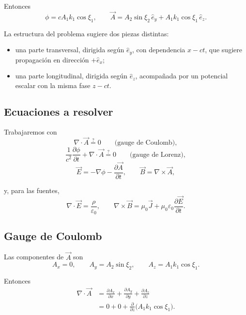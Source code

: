 \documentclass{article}
\numberwithin{equation}{section}
\begin{document}
Entonces
\begin{equation}
\phi=cA_1k_1\cos\xi_1,
\qquad
\vec A=A_2\sin\xi_2\,\hat e_y + A_1k_1\cos\xi_1\,\hat e_z.
\end{equation}

La estructura del problema sugiere dos piezas distintas:
\begin{itemize}
    \item una parte transversal, dirigida según $\hat e_y$, con dependencia $x-ct$, que sugiere propagación en dirección $+\hat e_x$;
    \item una parte longitudinal, dirigida según $\hat e_z$, acompañada por un potencial escalar con la misma fase $z-ct$.
\end{itemize}


\subsection{Ecuaciones a resolver}
Trabajaremos con
\begin{equation}
\nabla\cdot\vec A \stackrel{?}{=} 0 \qquad \text{(gauge de Coulomb)},
\end{equation}
\begin{equation}
\frac{1}{c^2}\frac{\partial \phi}{\partial t}+\nabla\cdot\vec A \stackrel{?}{=} 0 \qquad \text{(gauge de Lorenz)},
\end{equation}
\begin{equation}
\vec E=-\nabla\phi-\frac{\partial\vec A}{\partial t},
\qquad
\vec B=\nabla\times\vec A,
\end{equation}

y, para las fuentes,
\begin{equation}
\nabla\cdot\vec E=\frac{\rho}{\varepsilon_0},
\qquad
\nabla\times\vec B=\mu_0\vec J+\mu_0\varepsilon_0\frac{\partial\vec E}{\partial t}.
\end{equation}

\subsection{Gauge de Coulomb}
Las componentes de $\vec A$ son
\begin{equation}
A_x=0,
\qquad
A_y=A_2\sin\xi_2,
\qquad
A_z=A_1k_1\cos\xi_1.
\end{equation}

Entonces
\begin{align}
\nabla\cdot\vec A
&=\frac{\partial A_x}{\partial x}+\frac{\partial A_y}{\partial y}+\frac{\partial A_z}{\partial z} \\
&=0+0+\frac{\partial}{\partial z}\big(A_1k_1\cos\xi_1\big).
\end{align}
\end{document}
